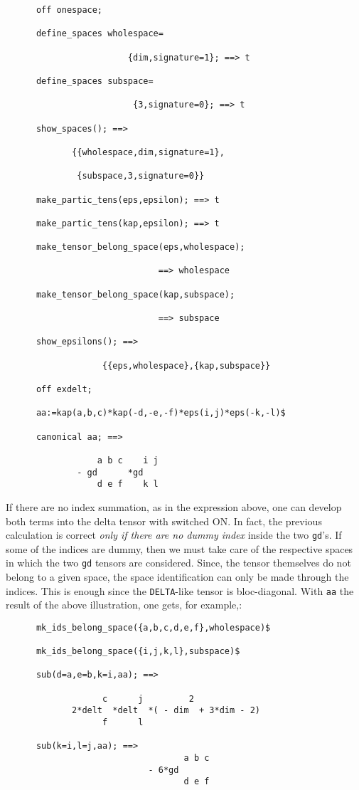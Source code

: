 \begin{verbatim}
      off onespace;

      define_spaces wholespace=

                        {dim,signature=1}; ==> t

      define_spaces subspace=

                         {3,signature=0}; ==> t

      show_spaces(); ==>

             {{wholespace,dim,signature=1},

              {subspace,3,signature=0}}

      make_partic_tens(eps,epsilon); ==> t 

      make_partic_tens(kap,epsilon); ==> t 

      make_tensor_belong_space(eps,wholespace);

                              ==> wholespace

      make_tensor_belong_space(kap,subspace);

                              ==> subspace

      show_epsilons(); ==> 

                   {{eps,wholespace},{kap,subspace}}

      off exdelt;

      aa:=kap(a,b,c)*kap(-d,-e,-f)*eps(i,j)*eps(-k,-l)$

      canonical aa; ==>

                  a b c    i j
              - gd      *gd    
                  d e f    k l

\end{verbatim}
If there are no index summation, as in the expression above, one can 
develop both terms into the delta tensor with %
 switched ON. 
In fact, the previous calculation is correct \emph{only if there are no 
dummy index} inside the two \texttt{gd}'s. 
If some of the indices are 
dummy, then  
we must 
take care of the respective spaces in which the two \texttt{gd} tensors 
are considered. Since, the tensor themselves do not belong 
to a given space, the space identification can only be made through 
the indices. This is enough since the \texttt{DELTA}-like tensor 
is bloc-diagonal. With \texttt{aa} the result of the above illustration,
one gets, for example,: 
\begin{verbatim}
      mk_ids_belong_space({a,b,c,d,e,f},wholespace)$
   
      mk_ids_belong_space({i,j,k,l},subspace)$
  
      sub(d=a,e=b,k=i,aa); ==>

                   c      j         2
             2*delt  *delt  *( - dim  + 3*dim - 2)
                   f      l

      sub(k=i,l=j,aa); ==> 
                                   a b c
                            - 6*gd
                                   d e f
\end{verbatim}

